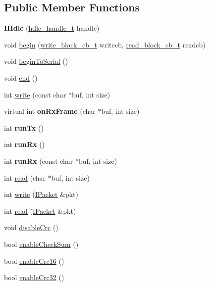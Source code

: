 \subsection*{Public Member Functions}
\begin{DoxyCompactItemize}
\item 
\mbox{\label{classTiny_1_1IHdlc_a15f85be7877d53d87f0cd74b65caf34f}} 
{\bfseries I\+Hdlc} (\hyperlink{struct__hdlc__handle__t}{hdlc\+\_\+handle\+\_\+t} handle)
\item 
void \hyperlink{classTiny_1_1IHdlc_aa14687d45f4762e1a87b8a4afc871a4b}{begin} (\hyperlink{tiny__types_8h_aafd634660bba76cace57a8f9b01e044d}{write\+\_\+block\+\_\+cb\+\_\+t} writecb, \hyperlink{tiny__types_8h_a15bec127d9ee63658563d62e92b5261b}{read\+\_\+block\+\_\+cb\+\_\+t} readcb)
\item 
void \hyperlink{classTiny_1_1IHdlc_a549747579cf72e8809b2939104d42667}{begin\+To\+Serial} ()
\item 
void \hyperlink{classTiny_1_1IHdlc_aba569c97764fdd95e6f140ef51ea83f8}{end} ()
\item 
int \hyperlink{classTiny_1_1IHdlc_ab02dd87b4465ffb73fd409dffbe394d2}{write} (const char $\ast$buf, int size)
\item 
\mbox{\label{classTiny_1_1IHdlc_ae92a1f290170a66c134ed1590b8b6443}} 
virtual int {\bfseries on\+Rx\+Frame} (char $\ast$buf, int size)
\item 
\mbox{\label{classTiny_1_1IHdlc_a9528b5ff0d144dec04a4cb9697375e57}} 
int {\bfseries run\+Tx} ()
\item 
\mbox{\label{classTiny_1_1IHdlc_ab533b1df48de51f8fa3ddf618c3496c9}} 
int {\bfseries run\+Rx} ()
\item 
\mbox{\label{classTiny_1_1IHdlc_a131c6ca93f267fff7c2f8b59449e562a}} 
int {\bfseries run\+Rx} (const char $\ast$buf, int size)
\item 
int \hyperlink{classTiny_1_1IHdlc_a54c9d5e5be794fa119d526578392825a}{read} (char $\ast$buf, int size)
\item 
int \hyperlink{classTiny_1_1IHdlc_aca84fd7cf4d6b88e31064fc8bc43ddcb}{write} (\hyperlink{classTiny_1_1IPacket}{I\+Packet} \&pkt)
\item 
int \hyperlink{classTiny_1_1IHdlc_a275940cd1c426e41b5201f011aa05723}{read} (\hyperlink{classTiny_1_1IPacket}{I\+Packet} \&pkt)
\item 
void \hyperlink{classTiny_1_1IHdlc_aa96fa5be8ae3ee108258a4f0a6c14cba}{disable\+Crc} ()
\item 
bool \hyperlink{classTiny_1_1IHdlc_abb55ff8f38be7541b9b2bb4832c7ecda}{enable\+Check\+Sum} ()
\item 
bool \hyperlink{classTiny_1_1IHdlc_acedafa846397ca07002d2c6374d6d85e}{enable\+Crc16} ()
\item 
bool \hyperlink{classTiny_1_1IHdlc_a857e7423c3ac10f15fac95e23e2a3eee}{enable\+Crc32} ()
\end{DoxyCompactItemize}
